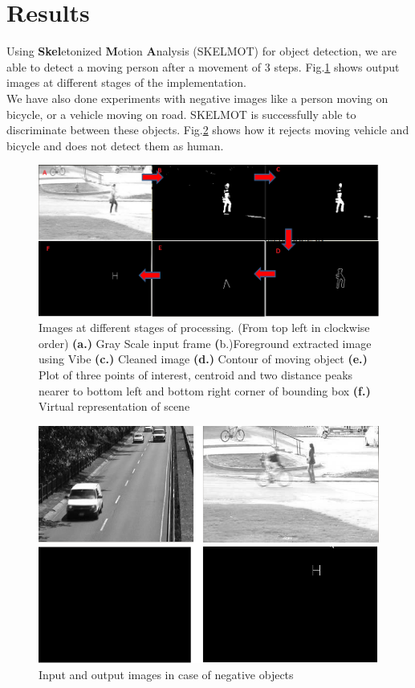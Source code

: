 \documentclass[conference]{IEEEtran}
\begin{document}
\section{Results}
\indent Using \textbf{Skel}etonized \textbf{M}otion \textbf{A}nalysis
(SKELMOT) for object detection, we are able to detect a moving person
after a movement of 3 steps. Fig.\ref{pipeline_images} shows output
images at different stages of the implementation.\\
\indent We have also done experiments with negative images like a person
moving on bicycle, or a vehicle moving on road. SKELMOT is successfully able
to discriminate between these objects. Fig.\ref{negative_inputs} shows
how it rejects moving vehicle and bicycle and  does not detect them as
human.\\
\begin{figure}[!h]
\centering
\includegraphics[scale=0.30]{figures/pipeline_images}
\caption{Images at different stages of processing. (From top left in
clockwise order) \textbf{(a.)} Gray Scale input frame 
\textbf({b.)}Foreground extracted image using Vibe \textbf{(c.)} Cleaned
image \textbf{(d.)} Contour of moving object \textbf{(e.)} Plot of three points
of interest, centroid and two distance peaks nearer to bottom left and
bottom right corner of bounding box \textbf{(f.)} Virtual representation
of scene} 
\label{pipeline_images}
\end{figure}

\begin{figure}[!h]
\centering
\includegraphics[scale=0.30]{figures/negative_inputs}
\caption{Input and output images in case of negative objects}
\label{negative_inputs}
\end{figure}
\end{document}
